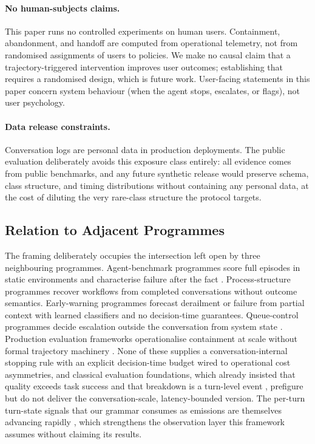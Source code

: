 \paragraph{No human-subjects claims.}
This paper runs no controlled experiments on human users.
Containment, abandonment, and handoff are computed from operational telemetry, not from randomised assignments of users to policies.
We make no causal claim that a trajectory-triggered intervention improves user outcomes; establishing that requires a randomised design, which is future work.
User-facing statements in this paper concern system behaviour (when the agent stops, escalates, or flags), not user psychology.

\paragraph{Data release constraints.}
Conversation logs are personal data in production deployments.
The public evaluation deliberately avoids this exposure class entirely: all evidence comes from public benchmarks, and any future synthetic release would preserve schema, class structure, and timing distributions without containing any personal data, at the cost of diluting the very rare-class structure the protocol targets.

\subsection{Relation to Adjacent Programmes}
\label{sec:discussion_related}

The framing deliberately occupies the intersection left open by three neighbouring programmes.
Agent-benchmark programmes score full episodes in static environments \citep{sierra2024taubench,webarena2023} and characterise failure after the fact \citep{falsesuccess2026,earlyeval2026}.
Process-structure programmes recover workflows from completed conversations \citep{salesforce2025workflows} without outcome semantics.
Early-warning programmes forecast derailment or failure from partial context \citep{chang2019derailment,nourbakhsh2026tracer} with learned classifiers and no decision-time guarantees.
Queue-control programmes decide escalation outside the conversation from system state \citep{queuecontrol2026,silentabandonment2024}.
Production evaluation frameworks operationalise containment at scale without formal trajectory machinery \citep{nubank2026}.
None of these supplies a conversation-internal stopping rule with an explicit decision-time budget wired to operational cost asymmetries, and classical evaluation foundations, which already insisted that quality exceeds task success \citep{walker1997paradise} and that breakdown is a turn-level event \citep{higashinaka2016breakdown}, prefigure but do not deliver the conversation-scale, latency-bounded version.
The per-turn turn-state signals that our grammar consumes as emissions are themselves advancing rapidly \citep{x2turn2026}, which strengthens the observation layer this framework assumes without claiming its results.

